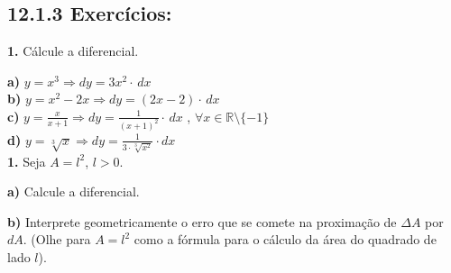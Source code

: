 \documentclass[article,12pt,oneside,a4paper,brazil]{abntex2}
\begin{document}
	\subsection*{12.1.3 Exercícios: }
	\begin{flushleft}	
		\textbf{1.} Cálcule a diferencial.
		
		\textbf{a) } $y = x^3 \Rightarrow dy = 3x^2 \cdot \,dx$ \\[1em]
		
		\textbf{b) } $y = x^2 -2x \Rightarrow dy = \left( 2x - 2 \right) \cdot \,dx$ \\[1em]
		
		\textbf{c) } $y = \frac{x}{x + 1} \Rightarrow dy = \frac{1}{(x + 1)^2} \cdot \,dx$ ,  $\forall x \in \mathbb{R} \setminus \{ -1 \}$ \\[1em]
		
		\textbf{d) } $y = \sqrt[3]{x} \Rightarrow  dy = \frac{1}{3 \cdot \sqrt[3]{x^2}} \cdot dx$ \\[1em]
		
		\textbf{1.} Seja $A = l^2$, $l > 0$.
		
		\textbf{a) } Calcule a diferencial.
		
		\textbf{b) } Interprete geometricamente o erro que se comete na proximação de $\Delta{A}$ por $dA$. (Olhe para $A = l^2$ como a fórmula para o cálculo da área do quadrado de lado $l$).
		
				
	\end{flushleft}
	
	
	
	
\end{document}
